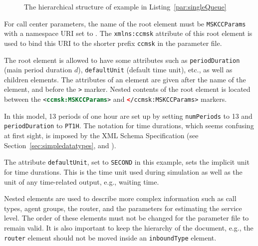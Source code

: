 \begin{figure}
\centering

\caption{The hierarchical structure of example in Listing~\ref{par:singleQueue}}
\label{fig:singleQueue}
\end{figure}

For call center parameters,
the name of the root element must be
\texttt{MSKCCParams}
with a namespace URI set to
.
The \texttt{xmlns:ccmsk} attribute of this root element is used to
bind this URI to the shorter prefix \texttt{ccmsk} in the parameter
file.

The root element
is allowed to have some attributes such as
\texttt{period\-Duration} (main period duration
$d$),
\texttt{defaultUnit} (default time unit), etc.,
as well as children elements.
The attributes of an element are given after the name of the element,
and before the \texttt{>} marker.
Nested contents of the root element
is located between the
\lstinline[language=XML]!<ccmsk:MSKCCParams>!
and \lstinline[language=XML]!</ccmsk:MSKCCParams>! markers.

In this model, 13 periods of one hour are set up by setting
\texttt{num\-Periods} to 13 and \texttt{period\-Duration} to
\texttt{PT1H}.
The notation for time durations, which seems confusing at first
sight, is imposed by the XML Schema Specification (see
Section~\ref{sec:simpledatatypes}, and \cite[part 2, section
3.2.6]{iSPE00a}).

The attribute
\texttt{default\-Unit},
set to \texttt{SECOND} in this example, sets the implicit unit
for time
durations.
This is the time unit used during simulation as well as the unit of
any time-related output, e.g., waiting time.

Nested elements are used to describe more complex information such
as call types, agent groups, the router, and the parameters
for estimating the service level.
The order of these elements must not be changed for the parameter file
to remain valid.
It is also important to keep the hierarchy of the document, e.g.,
the \texttt{router} element should not be moved inside an
\texttt{inbound\-Type} element.

